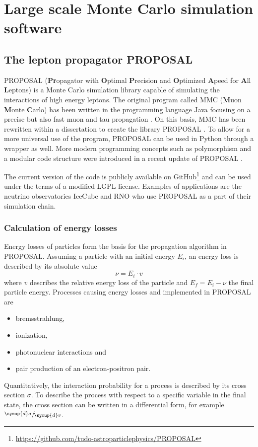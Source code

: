\chapter{Large scale Monte Carlo simulation software}

\section{The lepton propagator PROPOSAL}

PROPOSAL (\textbf{Pr}opagator with \textbf{O}ptimal \textbf{P}recision and \textbf{O}ptimized \textbf{A}peed for \textbf{A}ll \textbf{L}eptons) is a Monte Carlo simulation library capable of simulating the interactions of high energy leptons.
The original program called MMC (\textbf{M}uon \textbf{M}onte \textbf{C}arlo) has been written in the programming language Java focusing on a precise but also fast muon and tau propagation \cite{chirkin2004propagating}.
On this basis, MMC has been rewritten within a dissertation to create the \CC library PROPOSAL \cite{Kohne:2013zbq}.
To allow for a more universal use of the program, PROPOSAL can be used in Python through a wrapper as well.
More modern programming concepts such as polymorphism and a modular code structure were introduced in a recent update of PROPOSAL \cite{dunsch_2018_proposal_improvements}.

The current version of the code is publicly available on GitHub\footnote{\url{https://github.com/tudo-astroparticlephysics/PROPOSAL}} and can be used under the terms of a modified LGPL license.
Examples of applications are the neutrino observatories IceCube and RNO who use PROPOSAL as a part of their simulation chain.

\subsection{Calculation of energy losses}
\label{sec:energy_loss_calculation}

Energy losses of particles form the basis for the propagation algorithm in PROPOSAL.
Assuming a particle with an initial energy $E_i$, an energy loss is described by its absolute value
\begin{equation}
	\nu = E_i \cdot v
\end{equation}
%
where $v$ describes the relative energy loss of the particle and $E_f = E_i - \nu$ the final particle energy.
Processes causing energy losses and implemented in PROPOSAL are
%
\begin{itemize}
	\item bremsstrahlung,
	\item ionization,
	\item photonuclear interactions and
	\item pair production of an electron-positron pair.
\end{itemize}
%
Quantitatively, the interaction probability for a process is described by its cross section $\sigma$.
To describe the process with respect to a specific variable in the final state, the cross section can be written in a differential form, for example $\sfrac{\symup{d}\sigma}{\symup{d}v}$.

